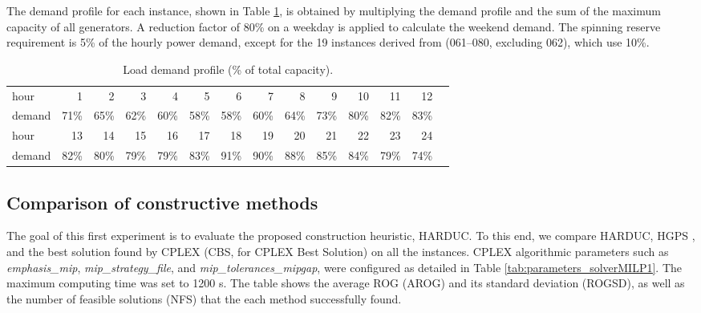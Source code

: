 The demand profile for each instance, shown in Table \ref{tab:Load}, is obtained by multiplying the demand profile and the sum of the maximum capacity of all generators. A reduction factor of 80\% on a weekday is applied to calculate the weekend demand. The spinning reserve requirement is 5\% of the hourly power demand, except for the 19 instances derived from \citet{Morales-Espania2013} (061--080, excluding 062), which use 10\%.

\begin{table}[H]
\centering
\caption{Load demand profile (\% of total capacity).}\label{tab:Load}
\scriptsize
\begin{tabular}{lrrrrrrrrrrrrr}\toprule
hour &1 &2 &3 &4 &5 &6 &7 &8 &9 &10 &11 &12 \\
demand &71\% &65\% &62\% &60\% &58\% &58\% &60\% &64\% &73\% &80\% &82\% &83\% \\\cmidrule{1-13}
hour &13 &14 &15 &16 &17 &18 &19 &20 &21 &22 &23 &24 \\
demand &82\% &80\% &79\% &79\% &83\% &91\% &90\% &88\% &85\% &84\% &79\% &74\% \\
\bottomrule
\end{tabular}
\end{table}



\subsection{Comparison of constructive methods}
\label{section:Test1}

The goal of this first experiment is to evaluate
the proposed construction heuristic, HARDUC.
To this end, we compare HARDUC, HGPS \citep{Harjunkoski2021}, and the best solution found
by CPLEX (CBS, for CPLEX Best Solution) on all the instances.
%
 CPLEX algorithmic parameters such as \textit{emphasis\_mip}, \textit{mip\_strategy\_file}, and \textit{mip\_tolerances\_mipgap}, were configured as detailed in Table \ref{tab:parameters_solverMILP1}. The maximum computing time was set to 1200 s.  The table shows the average ROG (AROG) and its standard deviation (ROGSD), as well as the number of feasible solutions (NFS) that the each method successfully found.

